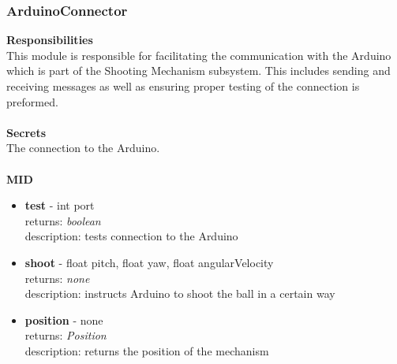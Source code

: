 \documentclass[11pt]{article}
\begin{document}
\subsubsection*{ArduinoConnector}
\textbf{Responsibilities} \\
This module is responsible for facilitating the communication with the Arduino which is part of the Shooting Mechanism subsystem. This includes sending and receiving messages as well as ensuring proper testing of the connection is preformed. \\ \\
\textbf{Secrets} \\
The connection to the Arduino. \\ \\
\textbf{MID}
\begin{itemize}
\item \textbf{test} - int port \\ returns: \textit{boolean} \\ description: tests connection to the Arduino
\item \textbf{shoot} - float pitch, float yaw, float angularVelocity \\ returns: \textit{none} \\ description: instructs Arduino to shoot the ball in a certain way
\item \textbf{position} - none \\ returns: \textit{Position} \\ description: returns the position of the mechanism
\end{itemize}
\end{document}
